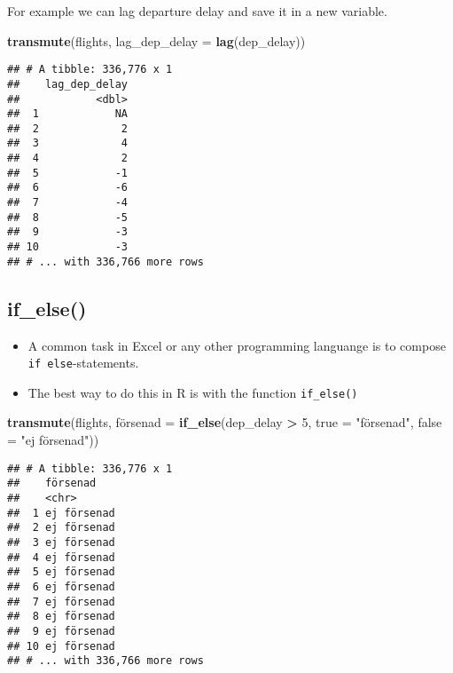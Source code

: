\documentclass[]{book}
\newenvironment{Shaded}{\begin{snugshade}}{\end{snugshade}}
\newcommand{\DataTypeTok}[1]{\textcolor[rgb]{0.13,0.29,0.53}{#1}}
\newcommand{\DecValTok}[1]{\textcolor[rgb]{0.00,0.00,0.81}{#1}}
\newcommand{\KeywordTok}[1]{\textcolor[rgb]{0.13,0.29,0.53}{\textbf{#1}}}
\newcommand{\NormalTok}[1]{#1}
\newcommand{\OperatorTok}[1]{\textcolor[rgb]{0.81,0.36,0.00}{\textbf{#1}}}
\newcommand{\StringTok}[1]{\textcolor[rgb]{0.31,0.60,0.02}{#1}}
\providecommand{\tightlist}{%
  \setlength{\itemsep}{0pt}\setlength{\parskip}{0pt}}
\begin{document}
For example we can lag departure delay and save it in a new variable.

\begin{Shaded}
\begin{Highlighting}[]
\KeywordTok{transmute}\NormalTok{(flights, }\DataTypeTok{lag_dep_delay =} \KeywordTok{lag}\NormalTok{(dep_delay))}
\end{Highlighting}
\end{Shaded}

\begin{verbatim}
## # A tibble: 336,776 x 1
##    lag_dep_delay
##            <dbl>
##  1            NA
##  2             2
##  3             4
##  4             2
##  5            -1
##  6            -6
##  7            -4
##  8            -5
##  9            -3
## 10            -3
## # ... with 336,766 more rows
\end{verbatim}

\hypertarget{if_else}{%
\subsection{if\_else()}\label{if_else}}

\begin{itemize}
\tightlist
\item
  A common task in Excel or any other programming languange is to compose \texttt{if\ else}-statements.
\item
  The best way to do this in R is with the function \texttt{if\_else()}
\end{itemize}

\begin{Shaded}
\begin{Highlighting}[]
\KeywordTok{transmute}\NormalTok{(flights, fö}\DataTypeTok{rsenad =} \KeywordTok{if_else}\NormalTok{(dep_delay  }\OperatorTok{>}\StringTok{ }\DecValTok{5}\NormalTok{, }\DataTypeTok{true =} \StringTok{"försenad"}\NormalTok{, }\DataTypeTok{false =} \StringTok{"ej försenad"}\NormalTok{))}
\end{Highlighting}
\end{Shaded}

\begin{verbatim}
## # A tibble: 336,776 x 1
##    försenad   
##    <chr>      
##  1 ej försenad
##  2 ej försenad
##  3 ej försenad
##  4 ej försenad
##  5 ej försenad
##  6 ej försenad
##  7 ej försenad
##  8 ej försenad
##  9 ej försenad
## 10 ej försenad
## # ... with 336,766 more rows
\end{verbatim}
\end{document}
